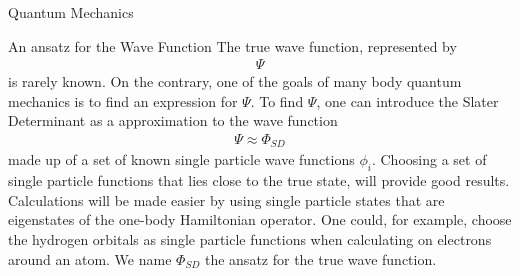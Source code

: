 \documentclass[twoside,english]{uiofysmaster}
\begin{document}
\begin{chapter}{Quantum Mechanics}
	\begin{section}{An ansatz for the Wave Function}
		The true wave function, represented by
		\begin{align}
			\Psi
		\end{align}
		is rarely known. On the contrary, one of the goals of many body quantum mechanics is to find an expression for $\Psi $. To find $\Psi$, one can introduce the Slater Determinant as a approximation to the wave function 
		\begin{align}
			\Psi \approx \Phi_{SD}
		\end{align}
		made up of a set of known single particle wave functions $\phi_i$. Choosing a set of single particle functions that lies close to the true state, will provide good results. Calculations will be made easier by using single particle states that are eigenstates of the one-body Hamiltonian operator. One could, for example, choose the hydrogen orbitals as single particle functions when calculating on electrons around an atom. We name $\Phi_{SD}$ the ansatz for the true wave function. 
	\end{section}


\end{chapter}
\end{document}
